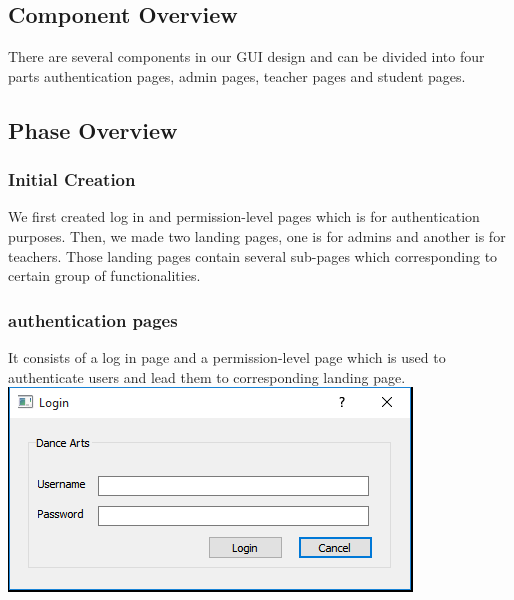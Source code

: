 \subsection{Component  Overview}
There are several components in our GUI design and can be divided into four parts authentication pages, admin pages, teacher pages and student pages.

\subsection{Phase Overview}

\subsubsection{Initial Creation}
We first created log in and permission-level pages which is for authentication purposes. Then, we made two landing pages, one is for admins and another is for teachers. Those landing pages contain several sub-pages which corresponding to certain group of functionalities.

\subsubsection{authentication pages}
It consists of a log in page and a permission-level page which is used to authenticate users and lead them to corresponding landing page.\\
\includegraphics[scale=0.7]{pics/login_page.png}


